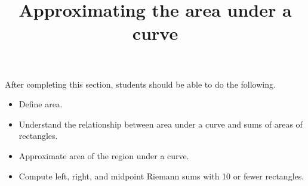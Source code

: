 \documentclass{ximera}
\title{Approximating the area under a curve}
\begin{document}
\begin{abstract}
\end{abstract}

\maketitle

\begin{sectionOutcomes}

After completing this section, students should be able to do the following.

\begin{itemize}
	\item Define area.
	\item Understand the relationship between area under a curve and sums of areas of rectangles.
	\item Approximate area of the region under a curve.
	\item Compute left, right, and midpoint Riemann sums with 10 or fewer rectangles.
\end{itemize}

\end{sectionOutcomes}
\end{document}

